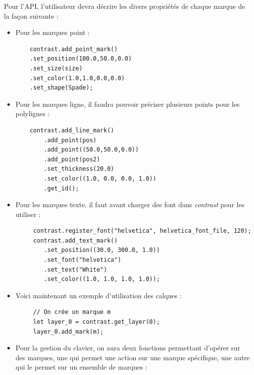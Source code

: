 \documentclass[12pt]{article}
\begin{document}
Pour l'API, l'utilisateur devra décrire les divers propriétés de chaque marque de la façon suivante :
\begin{itemize}
    \item Pour les marques point :

    \begin{verbatim}
    contrast.add_point_mark()
	.set_position(100.0,50.0,0.0)
	.set_size(size)
    .set_color(1.0,1.0,0.0,0.0)
	.set_shape(Spade);
    \end{verbatim}

    \item Pour les marques ligne, il faudra pouvoir préciser plusieurs points pour les polylignes :
    \begin{verbatim}
    contrast.add_line_mark()
		.add_point(pos)
        .add_point((50.0,50.0,0.0))
        .add_point(pos2)
        .set_thickness(20.0)
        .set_color((1.0, 0.0, 0.0, 1.0))
        .get_id();
    \end{verbatim}
    \item Pour les marques texte, il faut avant charger des font dans \textit{contrast} pour les utiliser :
     \begin{verbatim}
     contrast.register_font("helvetica", helvetica_font_file, 120);
     contrast.add_text_mark()
        .set_position((30.0, 300.0, 1.0))
        .set_font("helvetica")
        .set_text("White")
        .set_color((1.0, 1.0, 1.0, 1.0));
    \end{verbatim}
    \item Voici maintenant un exemple d'utilisation des calques :
    \begin{verbatim}
     // On crée un marque m
     let layer_0 = contrast.get_layer(0);
     layer_0.add_mark(m);
    \end{verbatim}
    \item Pour la gestion du clavier, on aura deux fonctions permettant d'opérer sur des marques, une qui permet une action 
sur une marque spécifique, une autre qui le permet sur un ensemble
    de marques :
    \begin{verbatim}

\end{verbatim}
\end{itemize}
\end{document}
